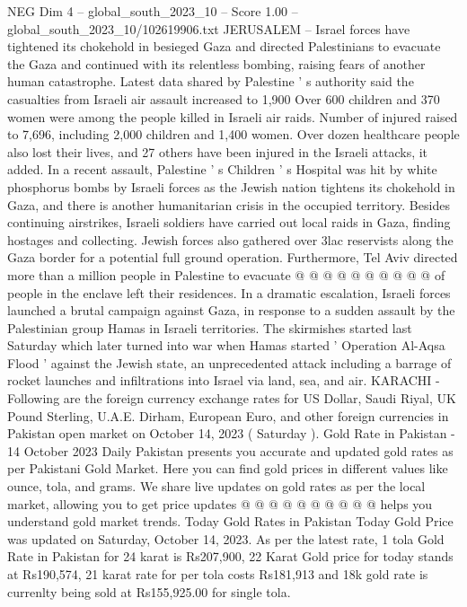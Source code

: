 \begin{textsample}{NEG Dim 4 – global\_south\_2023\_10 – Score 1.00 – global\_south\_2023\_10/102619906.txt}  \label{ex:f4_neg_028}
JERUSALEM -- Israel forces have tightened its chokehold in besieged Gaza and directed Palestinians to evacuate the Gaza and continued with its relentless bombing, raising fears of another human catastrophe.
Latest data shared by Palestine ' s authority said the casualties from Israeli air assault increased to 1,900 Over 600 children and 370 women were among the people killed in Israeli air raids.
Number of injured raised to 7,696, including 2,000 children and 1,400 women.
Over dozen healthcare people also lost their lives, and 27 others have been injured in the Israeli attacks, it added.
In a recent assault, Palestine ' s Children ' s Hospital was hit by white phosphorus bombs by Israeli forces as the Jewish nation tightens its chokehold in Gaza, and there is another humanitarian crisis in the occupied territory.
Besides continuing airstrikes, Israeli soldiers have carried out local raids in Gaza, finding hostages and collecting.
Jewish forces also gathered over 3lac reservists along the Gaza border for a potential full ground operation.
Furthermore, Tel Aviv directed more than a million people in Palestine to evacuate @ @ @ @ @ @ @ @ @ @ of people in the enclave left their residences.
In a dramatic escalation, Israeli forces launched a brutal campaign against Gaza, in response to a sudden assault by the Palestinian group Hamas in Israeli territories.
The skirmishes started last Saturday which later turned into war when Hamas started ' Operation Al-Aqsa Flood ' against the Jewish state, an unprecedented attack including a barrage of rocket launches and infiltrations into Israel via land, sea, and air.
KARACHI - Following are the foreign currency exchange rates for US Dollar, Saudi Riyal, UK Pound Sterling, U.A.E.
Dirham, European Euro, and other foreign currencies in Pakistan open market on October 14, 2023 ( Saturday ).
Gold Rate in Pakistan - 14 October 2023 Daily Pakistan presents you accurate and updated gold rates as per Pakistani Gold Market.
Here you can find gold prices in different values like ounce, tola, and grams.
We share live updates on gold rates as per the local market, allowing you to get price updates @ @ @ @ @ @ @ @ @ @ helps you understand gold market trends.
Today Gold Rates in Pakistan Today Gold Price was updated on Saturday, October 14, 2023.
As per the latest rate, 1 tola Gold Rate in Pakistan for 24 karat is Rs207,900, 22 Karat Gold price for today stands at Rs190,574, 21 karat rate for per tola costs Rs181,913 and 18k gold rate is currenlty being sold at Rs155,925.00 for single tola.

\end{textsample}
